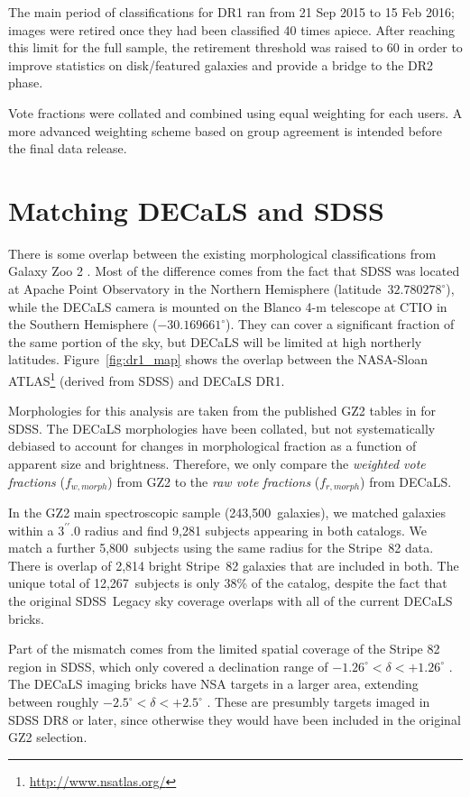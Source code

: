 \documentclass[iop,apj,tighten]{emulateapj}
\begin{document}
The main period of classifications for DR1 ran from 21 Sep 2015 to 15 Feb 2016; images were retired once they had been classified 40 times apiece. After reaching this limit for the full sample, the retirement threshold was raised to 60 in order to improve statistics on disk/featured galaxies and provide a bridge to the DR2 phase.

Vote fractions were collated and combined using equal weighting for each users. A more advanced weighting scheme based on group agreement is intended before the final data release.

\section{Matching DECaLS and SDSS}

There is some overlap between the existing morphological classifications from Galaxy Zoo 2 \citep{wil13}. Most of the difference comes from the fact that SDSS was located at Apache Point Observatory in the Northern Hemisphere (latitude~$32.780278^\circ$), while the DECaLS camera is mounted on the Blanco 4-m telescope at CTIO in the Southern Hemisphere ($-30.169661^\circ$). They can cover a significant fraction of the same portion of the sky, but DECaLS will be limited at high northerly latitudes. Figure~\ref{fig:dr1_map} shows the overlap between the NASA-Sloan ATLAS\footnote{\url{http://www.nsatlas.org/}} (derived from SDSS) and DECaLS DR1. 

Morphologies for this analysis are taken from the published GZ2 tables in \citet{wil13} for SDSS. The DECaLS morphologies have been collated, but not systematically debiased to account for changes in morphological fraction as a function of apparent size and brightness. Therefore, we only compare the \emph{weighted vote fractions} ($f_{w,morph}$) from GZ2 to the \emph{raw vote fractions} ($f_{r,morph}$) from DECaLS.

In the GZ2 main spectroscopic sample (243,500~galaxies), we matched galaxies within a $3^{\prime\prime}.0$ radius and find 9,281 subjects appearing in both catalogs. We match a further 5,800~subjects using the same radius for the Stripe~82 data. There is overlap of 2,814 bright Stripe~82 galaxies that are included in both. The unique total of 12,267~subjects is only 38\% of the  catalog, despite the fact that the original SDSS~Legacy sky coverage \citep{str02} overlaps with all of the current DECaLS bricks. 

Part of the mismatch comes from the limited spatial coverage of the Stripe 82 region in SDSS, which only covered a declination range of $-1.26^\circ<\delta<+1.26^\circ$ \citep{ann14}. The DECaLS imaging bricks have NSA targets in a larger area, extending between roughly $-2.5^\circ<\delta<+2.5^\circ$%
. These are presumbly targets imaged in SDSS DR8 or later, since otherwise they would have been included in the original GZ2 selection. 
\end{document}

